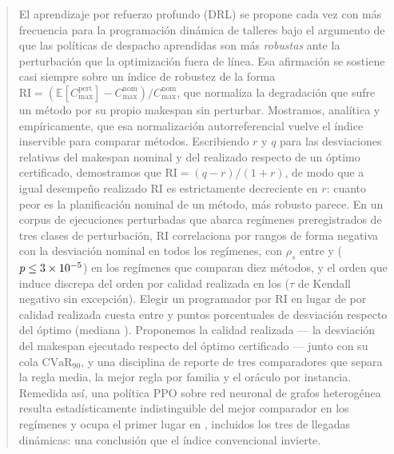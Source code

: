 \documentclass[a4paper,fleqn]{cas-sc}
\newcommand{\Cmax}{C_{\max}}
\newcommand{\RI}{\mathrm{RI}}
\newcommand{\CVaR}{\mathrm{CVaR}}
\begin{document}
\begin{abstract}
El aprendizaje por refuerzo profundo (DRL) se propone cada vez con más
frecuencia para la programación dinámica de talleres bajo el argumento de que
las políticas de despacho aprendidas son más \emph{robustas} ante la
perturbación que la optimización fuera de línea. Esa afirmación se sostiene casi
siempre sobre un índice de robustez de la forma
$\RI=(\mathbb{E}[\Cmax^{\text{pert}}]-\Cmax^{\text{nom}})/\Cmax^{\text{nom}}$,
que normaliza la degradación que sufre un método por su propio makespan sin
perturbar. Mostramos, analítica y empíricamente, que esa normalización
autorreferencial vuelve el índice inservible para comparar métodos. Escribiendo
$r$ y $q$ para las desviaciones relativas del makespan nominal y del realizado
respecto de un óptimo certificado, demostramos que $\RI=(q-r)/(1+r)$, de modo
que a igual desempeño realizado $\RI$ es estrictamente decreciente en $r$:
cuanto peor es la planificación nominal de un método, más robusto parece. En un
corpus de \NRunsDisrupted{} ejecuciones perturbadas que abarca \NRegimes{}
regímenes preregistrados de tres clases de perturbación, $\RI$ correlaciona por
rangos de forma negativa con la desviación nominal en todos los regímenes, con
$\rho_s$ entre \RhoConfMin{} y \RhoConfMax{} ($p\le\PConfMax{}$) en los
\NConfRegimes{} regímenes que comparan diez métodos, y el orden que induce
discrepa del orden por calidad realizada en los \NRegimes{} ($\tau$ de Kendall
negativo sin excepción). Elegir un programador por $\RI$ en lugar de por calidad
realizada cuesta entre \PenaltyMin{} y \PenaltyMax{} puntos porcentuales de
desviación respecto del óptimo (mediana \PenaltyMedian{}). Proponemos la calidad
realizada --- la desviación del makespan ejecutado respecto del óptimo
certificado --- junto con su cola $\CVaR_{90}$, y una disciplina de reporte de
tres comparadores que separa la regla media, la mejor regla por familia y el
oráculo por instancia. Remedida así, una política PPO sobre red neuronal de
grafos heterogénea resulta estadísticamente indistinguible del mejor comparador
en los \NRegimes{} regímenes y ocupa el primer lugar en \NRLBest{}, incluidos los
tres de llegadas dinámicas: una conclusión que el índice convencional invierte.
\end{abstract}
\end{document}
